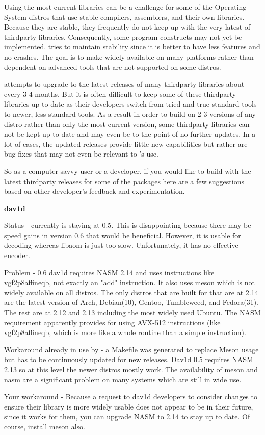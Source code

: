 Using the most current libraries can be a challenge for some of the Operating System distros that use
stable compilers, assemblers, and their own libraries.  Because they are stable, they frequently do
not keep up with the very latest of thirdparty libraries.  Consequently, some program constructs may
not yet be implemented.  \CGG{} tries to maintain stability since it is better to have less features
and no crashes.  The goal is to make \CGG{} widely available on many platforms rather than
dependent on advanced tools that are not supported on some distros.

\CGG{} attempts to upgrade to the latest releases of many thirdparty libraries about every 3-4
months. But it is often difficult to keep some of these thirdparty libraries up to date as their
developers switch from tried and true standard tools to newer, less standard tools. As a result 
in order to build \CGG{} on 2-3 versions of any distro rather than only the most current version,
some thirdparty libraries can not be kept up to date and may even be to the point of no further
updates.  In a lot of cases, the updated releases provide little new capabilities but rather
are bug fixes that may not even be relevant to \CGG{}'s use.

So as a computer savvy user or a developer, if you would like to build \CGG{} with the latest
thirdparty releases for some of the packages here are a few suggestions based on other 
developer's feedback and experimentation.

\textbf{dav1d} 
\begin{description}[noitemsep]
     \item Status - currently \CGG{} is staying at 0.5.  This is disappointing because there
may be speed gains in version 0.6 that would be beneficial. However, it is usable for decoding
whereas libaom is just too slow.  Unfortunately, it has no effective encoder.
     \item Problem - 0.6 dav1d requires NASM 2.14 and uses instructions like vgf2p8affineqb,
not exactly an "add" instruction. It also uses meson which is not widely available on all
distros.  The only distros that are built for \CGG{} that are at 2.14 are the latest version
of Arch, Debian(10), Gentoo, Tumbleweed, and Fedora(31). The rest are at 2.12 and 2.13 including
the most widely used Ubuntu. The NASM requirement apparently provides for using AVX-512 
instructions (like vgf2p8affineqb, which is more like a whole routine than a simple instruction).
     \item Workaround already in use by \CGG{} - a Makefile was generated to replace Meson usage
but has to be continuously updated for new releases. Dav1d 0.5 requires NASM 2.13 so at this level
the newer distros mostly work.  The availability of meson and nasm are a significant problem on
many systems which are still in wide use.
     \item Your workaround - Because a request to dav1d developers to consider changes to
ensure their library is more widely usable does not appear to be in their future, since it works
for them, you can upgrade NASM to 2.14 to stay up to date.  Of course, install meson also.
\end{description}

